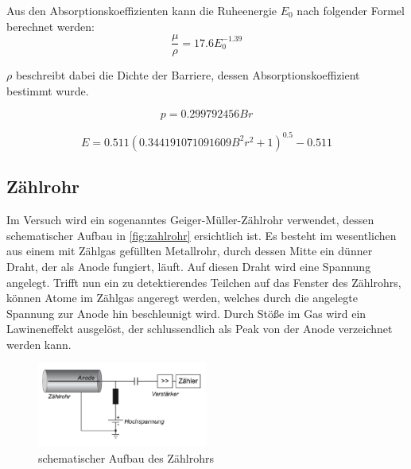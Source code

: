 \documentclass[12pt,english,ngerman]{scrartcl}
\begin{document}
Aus den Absorptionskoeffizienten kann die Ruheenergie \(E_0\) nach folgender
Formel berechnet werden:
\begin{equation}
  \frac{\mu}{\rho} = 17.6 E_0^{-1.39}
\end{equation}

\(\rho\) beschreibt dabei die Dichte der Barriere, dessen
Absorptionskoeffizient bestimmt wurde.\cite[]{}

\begin{equation}
  p = 0.299792456 B r
  \label{eq:lorentzimpuls}
\end{equation}

\begin{equation}
  E = 0.511 \left(0.344191071091609 B^{2} r^{2} + 1\right)^{0.5} - 0.511
  \label{eq:energieimpulsrelation}
\end{equation}

\subsection{Zählrohr}

Im Versuch wird ein sogenanntes Geiger-Müller-Zählrohr verwendet, dessen schematischer Aufbau in \autoref{fig:zahlrohr} ersichtlich ist.
Es besteht im wesentlichen aus einem mit Zählgas gefüllten Metallrohr, durch dessen Mitte ein dünner Draht, der als Anode fungiert,
läuft. Auf diesen Draht wird eine Spannung angelegt. Trifft nun ein zu detektierendes Teilchen auf das Fenster des
Zählrohrs, können Atome im Zählgas angeregt werden, welches durch die angelegte Spannung zur Anode hin beschleunigt
wird. Durch Stöße im Gas wird ein Lawineneffekt ausgelöst, der schlussendlich als Peak von der Anode verzeichnet werden kann.

\begin{figure}[H]
  \begin{center}
  \includegraphics[width = 0.5\textwidth]{./figures/zahlrohr.png}
	
\end{center}
	\caption{schematischer Aufbau des Zählrohrs~\cite[]{}}
	\label{fig:zahlrohr}

\end{figure}
\end{document}
